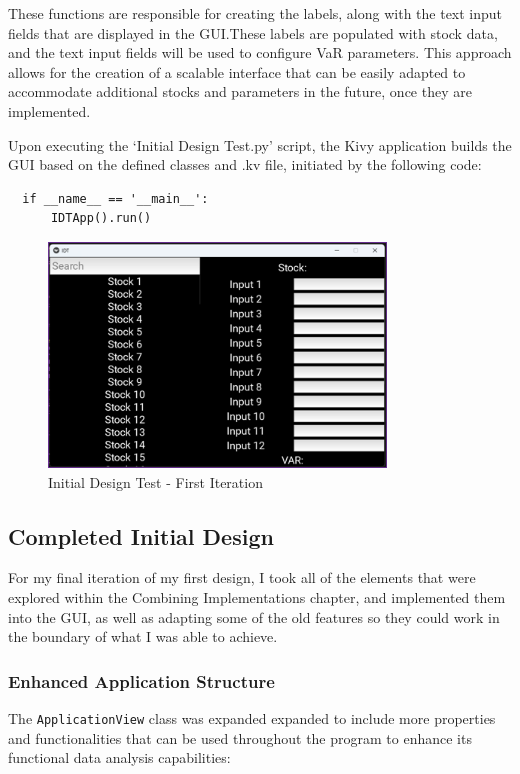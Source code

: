 \documentclass{article}
\begin{document}
These functions are responsible for creating the labels, along with the text input fields that are displayed in the GUI.\@ These labels are populated with stock data, and the text input fields will be used to configure VaR parameters. This approach allows for the creation of a scalable interface that can be easily adapted to accommodate additional stocks and parameters in the future, once they are implemented.\\\vspace{0.3cm}

Upon executing the `Initial Design Test.py' script, the Kivy application builds the GUI based on the defined classes and .kv file, initiated by the following code:

\begin{verbatim}
  if __name__ == '__main__':
      IDTApp().run()
\end{verbatim}

\begin{figure}[h!]
  \centering
  \includegraphics[width=0.8\textwidth]{Images/Initial Design Test Image 1.png}
  \caption{Initial Design Test - First Iteration}
  \label{fig:Initial Design Test - First Iteration}
\end{figure}

\newpage

\subsection{Completed Initial Design}
For my final iteration of my first design, I took all of the elements that were explored within the Combining Implementations chapter, and implemented them into the GUI, as well as adapting some of the old features so they could work in the boundary of what I was able to achieve.


\subsubsection{Enhanced Application Structure}
The \texttt{ApplicationView} class was expanded expanded to include more properties and functionalities that can be used throughout the program to enhance its functional data analysis capabilities:
\end{document}
